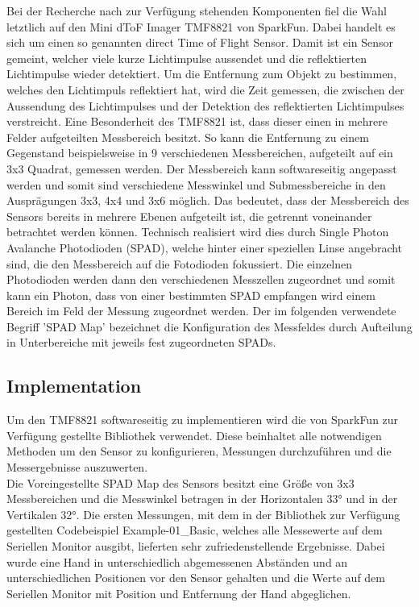         Bei der Recherche nach zur Verfügung stehenden Komponenten fiel die Wahl letztlich auf den Mini dToF Imager TMF8821 von SparkFun. Dabei handelt es sich um einen so genannten direct Time of Flight Sensor. Damit ist ein Sensor gemeint, welcher viele kurze Lichtimpulse aussendet und die reflektierten Lichtimpulse wieder detektiert. Um die Entfernung zum Objekt zu bestimmen, welches den Lichtimpuls reflektiert hat, wird die Zeit gemessen, die zwischen der Aussendung des Lichtimpulses und der Detektion des reflektierten Lichtimpulses verstreicht. Eine Besonderheit des TMF8821 ist, dass dieser einen in mehrere Felder aufgeteilten Messbereich besitzt. So kann die Entfernung zu einem Gegenstand beispielsweise in 9 verschiedenen Messbereichen, aufgeteilt auf ein 3x3 Quadrat, gemessen werden. Der Messbereich kann softwareseitig angepasst werden und somit sind verschiedene Messwinkel und Submessbereiche in den Ausprägungen 3x3, 4x4 und 3x6 möglich. Das bedeutet, dass der Messbereich des Sensors bereits in mehrere Ebenen aufgeteilt ist, die getrennt voneinander betrachtet werden können. Technisch realisiert wird dies durch Single Photon Avalanche Photodioden (SPAD), welche hinter einer speziellen Linse angebracht sind, die den Messbereich auf die Fotodioden fokussiert. Die einzelnen Photodioden werden dann den verschiedenen Messzellen zugeordnet und somit kann ein Photon, dass von einer bestimmten SPAD empfangen wird einem Bereich im Feld der Messung zugeordnet werden. Der im folgenden verwendete Begriff 'SPAD Map' bezeichnet die Konfiguration des Messfeldes durch Aufteilung in Unterbereiche mit jeweils fest zugeordneten SPADs.\\

    \subsection{Implementation}
        Um den TMF8821 softwareseitig zu implementieren wird die von SparkFun zur Verfügung gestellte Bibliothek verwendet. Diese beinhaltet alle notwendigen Methoden um den Sensor zu konfigurieren, Messungen durchzuführen und die Messergebnisse auszuwerten.\\

        Die Voreingestellte SPAD Map des Sensors besitzt eine Größe von 3x3 Messbereichen und die Messwinkel betragen in der Horizontalen 33° und in der Vertikalen 32°. Die ersten Messungen, mit dem in der Bibliothek zur Verfügung gestellten Codebeispiel Example-01\_Basic, welches alle Messewerte auf dem Seriellen Monitor ausgibt, lieferten sehr zufriedenstellende Ergebnisse. Dabei wurde eine Hand in unterschiedlich abgemessenen Abständen und an unterschiedlichen Positionen vor den Sensor gehalten und die Werte auf dem Seriellen Monitor mit Position und Entfernung der Hand abgeglichen.\\


